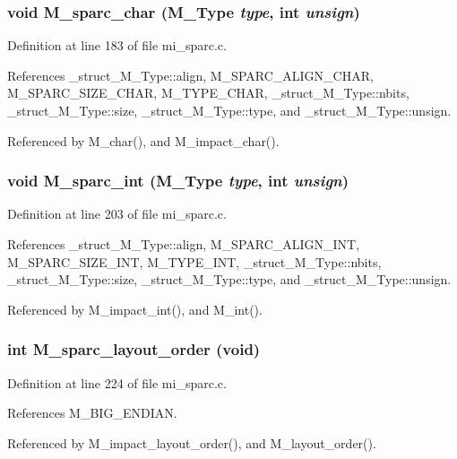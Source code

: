 \subsubsection{\setlength{\rightskip}{0pt plus 5cm}void M\_\-sparc\_\-char (\bf{M\_\-Type} {\em type}, int {\em unsign})}\label{mi__sparc_8c_c1019d13bd51f7d20727db1a7979ae89}




Definition at line 183 of file mi\_\-sparc.c.

References \_\-struct\_\-M\_\-Type::align, M\_\-SPARC\_\-ALIGN\_\-CHAR, M\_\-SPARC\_\-SIZE\_\-CHAR, M\_\-TYPE\_\-CHAR, \_\-struct\_\-M\_\-Type::nbits, \_\-struct\_\-M\_\-Type::size, \_\-struct\_\-M\_\-Type::type, and \_\-struct\_\-M\_\-Type::unsign.

Referenced by M\_\-char(), and M\_\-impact\_\-char().
\subsubsection{\setlength{\rightskip}{0pt plus 5cm}void M\_\-sparc\_\-int (\bf{M\_\-Type} {\em type}, int {\em unsign})}\label{mi__sparc_8c_ee0c15c98a1c26b4e91cde2552b950e8}




Definition at line 203 of file mi\_\-sparc.c.

References \_\-struct\_\-M\_\-Type::align, M\_\-SPARC\_\-ALIGN\_\-INT, M\_\-SPARC\_\-SIZE\_\-INT, M\_\-TYPE\_\-INT, \_\-struct\_\-M\_\-Type::nbits, \_\-struct\_\-M\_\-Type::size, \_\-struct\_\-M\_\-Type::type, and \_\-struct\_\-M\_\-Type::unsign.

Referenced by M\_\-impact\_\-int(), and M\_\-int().
\subsubsection{\setlength{\rightskip}{0pt plus 5cm}int M\_\-sparc\_\-layout\_\-order (void)}\label{mi__sparc_8c_463a66976af8f550a894da2b07818175}




Definition at line 224 of file mi\_\-sparc.c.

References M\_\-BIG\_\-ENDIAN.

Referenced by M\_\-impact\_\-layout\_\-order(), and M\_\-layout\_\-order().
